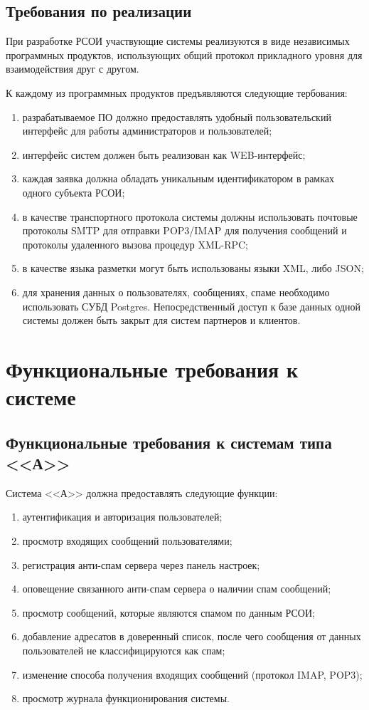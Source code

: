  \subsection{Требования по реализации}
 При разработке РСОИ участвующие системы реализуются в виде независимых программных продуктов, использующих общий протокол прикладного уровня для взаимодействия друг с другом. 

 К каждому из программных продуктов предъявляются следующие тербования:
 \begin{enumerate}
 	\item разрабатываемое ПО должно предоставлять удобный пользовательский интерфейс для работы администраторов и пользователей;
 	\item интерфейс систем должен быть реализован как WEB-интерфейс;
 	\item каждая заявка должна обладать уникальным идентификатором в рамках одного субъекта РСОИ;
 	\item в качестве транспортного протокола системы должны использовать почтовые протоколы SMTP для отправки POP3/IMAP для получения сообщений и протоколы удаленного вызова процедур XML-RPC;
 	\item в качестве языка разметки могут быть использованы языки XML, либо JSON;
 	\item для хранения данных о пользователях, сообщениях, спаме необходимо использовать СУБД Postgres. Непосредственный доступ к базе данных одной системы должен быть закрыт для систем партнеров и клиентов.
 \end{enumerate}


\section{Функциональные требования к системе}
\subsection{Функциональные требования к системам типа <<А>>}
Система <<А>> должна предоставлять следующие функции:
\begin{enumerate}
	\item аутентификация и авторизация пользователей;
	\item просмотр входящих сообщений пользователями;
	\item регистрация анти-спам сервера через панель настроек;
	\item оповещение связанного анти-спам сервера о наличии спам сообщений;
	\item просмотр сообщений, которые являются спамом по данным РСОИ;
	\item добавление адресатов в доверенный список, после чего сообщения от данных пользователей не классифицируются как спам;
	\item изменение способа получения входящих сообщений (протокол IMAP, POP3);
	\item просмотр журнала функционирования системы.
\end{enumerate}



